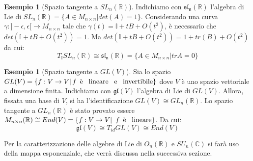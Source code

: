 \documentclass[12pt,a4paper]{report}
\theoremstyle{definition}
\theoremstyle{Theorem}
\theoremstyle{definition}
\newtheorem{Ex}[Def]{Esempio}
\theoremstyle{definition}
\theoremstyle{definition}
\begin{document}
\begin{Ex}[Spazio tangente a $SL_n(\mathbb{R})$]
	Indichiamo con $\mathfrak{sl_n(\mathbb{R})}$ l'algebra di Lie di $SL_n(\mathbb{R})=\{A\in M_{n\times n}|det(A)=1\}$.
	Considerando una curva $\gamma:]-\epsilon,\epsilon[\rightarrow M_{n\times n}$ tale che $\gamma(t)=\mathbb{I}+tB+O(t^2)$, è necessario che $det(\mathbb{I}+tB+O(t^2))=1$. Ma $det(\mathbb{I}+tB+O(t^2))=1+tr(B)+O(t^2)$ da cui: $$T_\mathbb{I}SL_n(\mathbb{R})\cong \mathfrak{sl_n(\mathbb{R})}=\{A\in M_{n\times n}|trA=0\}$$ 
\end{Ex}
\begin{Ex}[Spazio tangente a $GL(V)$]
	Sia lo spazio $GL(V)=\{f:V\rightarrow V|\, \textnormal{$f$\,  è \, lineare \, e \, invertibile}\}$ dove $V$ è uno spazio vettoriale a dimensione finita. Indichiamo con $\mathfrak{gl}(V)$ l'algebra di Lie di $GL(V)$.  Allora, fissata una base di $V$, si ha l'identificazione $GL(V)\cong GL_n(\mathbb{R})$. Lo spazio tangente a $GL_n(\mathbb{R})$ è stato provato essere $M_{n\times n}(\mathbb{R})\cong End(V)=\{f:V\rightarrow V|\textnormal{\, $f$\, è \, lineare}\}$. Da cui: 
	$$\mathfrak{gl}(V)\cong T_{id}GL(V)\cong End(V)$$ 
\end{Ex}
Per la caratterizzazione delle algebre di Lie di $O_n(\mathbb{R})$ e $SU_n(\mathbb{C})$ si farà uso della mappa esponenziale, che verrà discussa nella successiva sezione.
\end{document}
